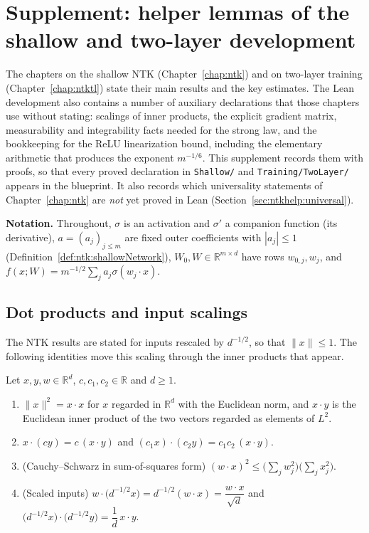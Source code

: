 \chapter{Supplement: helper lemmas of the shallow and two-layer development}\label{chap:ntkhelp}

The chapters on the shallow NTK (Chapter~\ref{chap:ntk}) and on two-layer training (Chapter~\ref{chap:ntktl}) state their main results and the key estimates. The Lean development also contains a number of auxiliary declarations that those chapters use without stating: scalings of inner products, the explicit gradient matrix, measurability and integrability facts needed for the strong law, and the bookkeeping for the ReLU linearization bound, including the elementary arithmetic that produces the exponent $m^{-1/6}$. This supplement records them with proofs, so that every proved declaration in \texttt{Shallow/} and \texttt{Training/TwoLayer/} appears in the blueprint. It also records which universality statements of Chapter~\ref{chap:ntk} are \emph{not} yet proved in Lean (Section~\ref{sec:ntkhelp:universal}).

\medskip\noindent\textbf{Notation.}
Throughout, $\sigma$ is an activation and $\sigma'$ a companion function (its derivative), $a=(a_j)_{j\le m}$ are fixed outer coefficients with $|a_j|\le1$ (Definition~\ref{def:ntk:shallowNetwork}), $W_0,W\in\mathbb R^{m\times d}$ have rows $w_{0,j},w_j$, and $f(x;W)=m^{-1/2}\sum_ja_j\sigma(w_j\cdot x)$.


\section{Dot products and input scalings}\label{sec:ntkhelp:dot}

The NTK results are stated for inputs rescaled by $d^{-1/2}$, so that $\|x\|\le1$. The following identities move this scaling through the inner products that appear.

\begin{lemma}\label{lem:ntkhelp:dotScaling}
  \leanok
Let $x,y,w\in\mathbb R^d$, $c,c_1,c_2\in\mathbb R$ and $d\ge1$.
\begin{enumerate}
  \item $\|x\|^2=x\cdot x$ for $x$ regarded in $\mathbb R^d$ with the Euclidean norm, and $x\cdot y$ is the Euclidean inner product of the two vectors regarded as elements of $L^2$.
  \item $x\cdot(cy)=c\,(x\cdot y)$ and $(c_1x)\cdot(c_2y)=c_1c_2\,(x\cdot y)$.
  \item (Cauchy--Schwarz in sum-of-squares form) $(w\cdot x)^2\le\bigl(\sum_jw_j^2\bigr)\bigl(\sum_jx_j^2\bigr)$.
  \item (Scaled inputs) $w\cdot\bigl(d^{-1/2}x\bigr)=d^{-1/2}(w\cdot x)=\dfrac{w\cdot x}{\sqrt d}$ and $\bigl(d^{-1/2}x\bigr)\cdot\bigl(d^{-1/2}y\bigr)=\dfrac1d\,x\cdot y$.
\end{enumerate}
\end{lemma}

